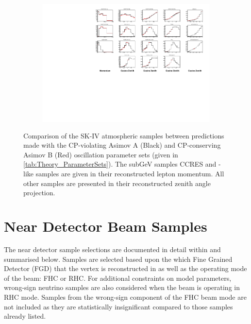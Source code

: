 \begin{figure}
  \centering
  \begin{subfigure}[t]{\textwidth}
    \includegraphics[width=\textwidth, trim={0mm 0mm 0mm 0mm}, clip,page=1]{Figures/Selections/HistogramComparison.pdf}
  \end{subfigure}
  \caption{Comparison of the SK-IV atmospheric samples between predictions made with the CP-violating Asimov A (Black) and CP-conserving Asimov B (Red) oscillation parameter sets (given in \autoref{tab:Theory_ParameterSets}). The subGeV samples CCRES and -like samples are given in their reconstructed lepton momentum. All other samples are presented in their reconstructed zenith angle projection.}
  \label{fig:SelsAndSysts_AllSampleComparison}
\end{figure}

\clearpage
\section{Near Detector Beam Samples}
\label{sec:SelsAndSysts_Sels_ND}

The near detector sample selections are documented in detail within \cite{t2k_tn_395} and summarised below. Samples are selected based upon the which Fine Grained Detector (FGD) that the vertex is reconstructed in as well as the operating mode of the beam: FHC or RHC. For additional constraints on model parameters, wrong-sign neutrino samples are also considered when the beam is operating in RHC mode. Samples from the wrong-sign component of the FHC beam mode are not included as they are statistically insignificant compared to those samples already listed.

